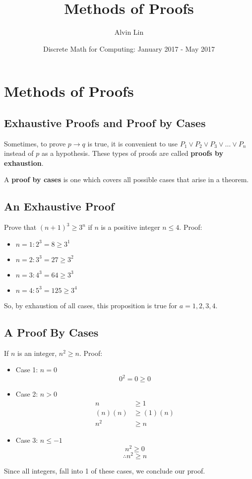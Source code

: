 \documentclass[letterpaper, 12pt]{math}
\title{Methods of Proofs}
\author{Alvin Lin}
\date{Discrete Math for Computing: January 2017 - May 2017}
\begin{document}
\maketitle

\section*{Methods of Proofs}

\subsection*{Exhaustive Proofs and Proof by Cases}
Sometimes, to prove \( p \to q \) is true, it is convenient to use
\( P_{1} \vee P_{2} \vee P_{3} \vee \dots \vee P_{n} \) instead of \( p \)
as a hypothesis. These types of proofs are called \textbf{proofs by
exhaustion}. \par
A \textbf{proof by cases} is one which covers all possible cases that arise in
a theorem.

\subsection*{An Exhaustive Proof}
Prove that \( (n+1)^{3} \geq 3^{n} \) if \( n \) is a positive integer
\( n \leq 4 \). Proof:
\begin{itemize}
  \item \( n = 1: 2^{3} = 8 \geq 3^{1} \)
  \item \( n = 2: 3^{3} = 27 \geq 3^{2} \)
  \item \( n = 3: 4^{3} = 64 \geq 3^{3} \)
  \item \( n = 4: 5^{3} = 125 \geq 3^{4} \)
\end{itemize}
So, by exhaustion of all cases, this proposition is true for \( a = 1,2,3,4 \).

\subsection*{A Proof By Cases}
If \( n \) is an integer, \( n^{2} \geq n \). Proof:
\begin{itemize}
  \item Case 1: \( n = 0 \)
    \[ 0^{2} = 0 \geq 0 \]
  \item Case 2: \( n > 0 \)
    \begin{align*}
      n &\geq 1 \\
      (n)(n) &\geq (1)(n) \\
      n^{2} &\geq n
    \end{align*}
  \item Case 3: \( n \leq -1 \)
    \[ n^{2} \geq 0 \]
    \[ \therefore n^{2} \geq n \]
\end{itemize}
Since all integers, fall into 1 of these cases, we conclude our proof.
\end{document}
